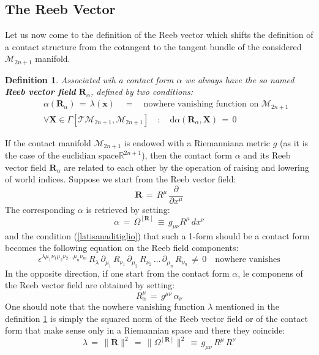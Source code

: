 \documentclass[10pt,a4paper]{article}
\newtheorem{definizione}{Definition}[section]
\begin{document}
\subsection{The Reeb Vector}
Let us now come to the definition of  the Reeb vector which shifts the definition of a contact structure from the cotangent to the tangent bundle of the considered  $\mathcal{M}_{2n+1}$  manifold.
\begin{definizione}\label{ribatriestina} Associated wih a contact form $\alpha$
we always have the so named  \textbf{Reeb vector field}
$\mathbf{R}_\alpha$, defined  by two conditions:
\begin{eqnarray}\label{Ribbo}
&&\alpha\left(\mathbf{R}_\alpha\right) \, = \, \lambda(\mathbf{x})
\quad =
 \quad
 \text{nowhere vanishing  function on $\mathcal{M}_{2n+1}$}\nonumber\\
 &&\forall \mathbf{X}\in \Gamma\left[\mathcal{TM}_{2n+1},\mathcal{M}_{2n+1}\right] \quad :
 \quad
 \mathrm{d}\alpha\left(\mathbf{R}_\alpha,\mathbf{X}\right)\, = \,
 0
\end{eqnarray}
\end{definizione}
If the contact manifold $\mathcal{M}_{2n+1}$  is endowed with a
Riemanniana metric $g$ (as it is the case of the
euclidian space$\mathbb{R}^{2n+1}$), then the contact form  $\alpha$ and its Reeb vector field
$\mathbf{R}_\alpha$  are related to each other  by the operation of raising and lowering of world indices.
 Suppose we start from the  Reeb vector field:
\begin{equation}\label{ribbone}
    \mathbf{R} \, = \, R^\mu \,
    \frac{\partial}{\partial x^\mu}
\end{equation}
The corresponding $\alpha$ is retrieved by setting:
\begin{equation}\label{contactribbo}
    \alpha \, = \, \Omega^{[\mathbf{R}]} \,  \equiv \, g_{\mu\nu} R^\mu \,
    dx^\nu
\end{equation}
and the condition (\ref{latisanaditiglio}) that such a 1-form should be a contact form
 becomes the following equation on the Reeb field components:
\begin{equation}\label{gridolino}
    \epsilon^{\lambda \mu_1\nu_1\mu_2\nu_2\dots\mu_n\nu_m} \,
    R_\lambda \, \partial_{\mu_1}\,R_{\nu_1}
    \,\partial_{\mu_2}\,R_{\nu_2}\, \dots\,
    \partial_{\mu_n}\,R_{\nu_n}\, \neq \, 0 \quad \text{nowhere vanishes}
\end{equation}
In the opposite direction, if one start from the contact form $\alpha$,
le componens of the  Reeb vector field are obtained by setting:
\begin{equation}\label{crinolina}
    R_\alpha^\mu \, = \, g^{\mu\nu} \, \alpha_\nu
\end{equation}
One should note that the nowhere vanishing function $\lambda$ mentioned
in the definition \ref{ribatriestina} is simply the squared norm of the Reeb vector field or of the contact form  that make sense only in a Riemannian space and there they coincide:
\begin{equation}\label{normaquadrata}
    \lambda \, =\, \parallel \mathbf{R}\parallel^2 \, = \, \parallel
    \Omega^{[\mathbf{R}]}\parallel^2 \, \equiv \, g_{\mu\nu} \, R^\mu \,
    R^\nu
\end{equation}
\end{document}
